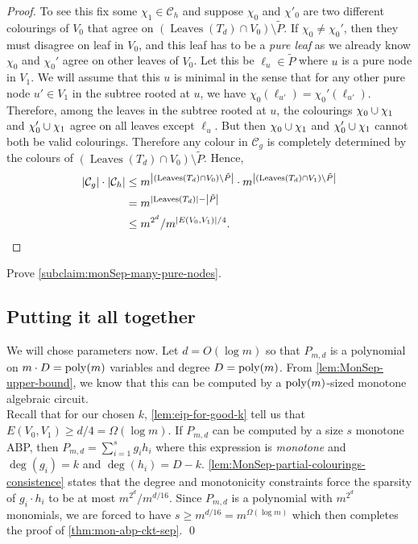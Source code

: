 \begin{proof}
To see this fix some $\chi_1 \in \mathcal{C}_h$ and suppose $\chi_0$ and $\chi'_0$ are two different colourings of $V_0$ that agree on $(\operatorname{Leaves}(T_d) \cap V_0) \setminus \tilde{P}$.
If $\chi_0 \neq \chi_0'$, then they must disagree on leaf in $V_0$, and this leaf has to be a \emph{pure leaf} as we already know $\chi_0$ and $\chi_0'$ agree on other leaves of $V_0$.
Let this be $\ell_u \in \tilde{P}$ where $u$ is a pure node in $V_1$.
We will assume that this $u$ is minimal in the sense that for any other pure node $u' \in V_1$ in the subtree rooted at $u$, we have $\chi_0(\ell_{u'}) = \chi_0'(\ell_{u'})$.
Therefore, among the leaves in the subtree rooted at $u$, the colourings $\chi_0 \cup \chi_1$ and $\chi_0' \cup \chi_1$ agree on all leaves except $\ell_u$. 
But then $\chi_0 \cup \chi_1$ and $\chi_0' \cup \chi_1$ cannot both be valid colourings. Therefore any colour in $\mathcal{C}_g$ is completely determined by the colours of $(\operatorname{Leaves}(T_d) \cap V_0) \setminus \tilde{P}$.
Hence,
\begin{align*}
  \left|\mathcal{C}_g\right|\cdot \left|\mathcal{C}_h\right| & \leq  m^{\left|(\operatorname{Leaves}(T_d) \cap V_0) \setminus \tilde{P}\right|} \cdot m^{\left|(\operatorname{Leaves}(T_d) \cap V_1) \setminus \tilde{P}\right|}\\
                                               & = m^{\left|\operatorname{Leaves}(T_d)\right| - \left|\tilde{P}\right|}\\
                                               & \leq m^{2^d} / m^{\left|E(V_0,V_1)\right|/4}.
\end{align*}
\end{proof}

\begin{exercise}
Prove \autoref{subclaim:monSep-many-pure-nodes}. 
\end{exercise}
\subsection*{Putting it all together}

We will chose parameters now. Let $d = O(\log m)$ so that $P_{m,d}$ is a polynomial on $m \cdot D = \operatorname{poly}(m)$ variables and degree $D = \operatorname{poly}(m)$. From \autoref{lem:MonSep-upper-bound}, we know that this can be computed by a $\operatorname{poly}(m)$-sized monotone algebraic circuit. \\

Recall that for our chosen $k$, \autoref{lem:eip-for-good-k} tell us that $E(V_0,V_1) \geq d/4 = \Omega(\log m)$. If $P_{m,d}$ can be computed by a size $s$ monotone ABP, then $P_{m,d} = \sum_{i=1}^s g_i h_i$ where this expression is \emph{monotone} and $\deg(g_i) = k$ and $\deg(h_i) = D - k$. 
\autoref{lem:MonSep-partial-colourings-consistence} states that the degree and monotonicity constraints force the sparsity of $g_i\cdot h_i$ to be at most $m^{2^d} / m^{d/16}$. Since $P_{m,d}$ is a polynomial with $m^{2^d}$ monomials, we are forced to have $s \geq m^{d/16} = m^{\Omega(\log m)}$ which then completes the proof of \autoref{thm:mon-abp-ckt-sep}. \qed




